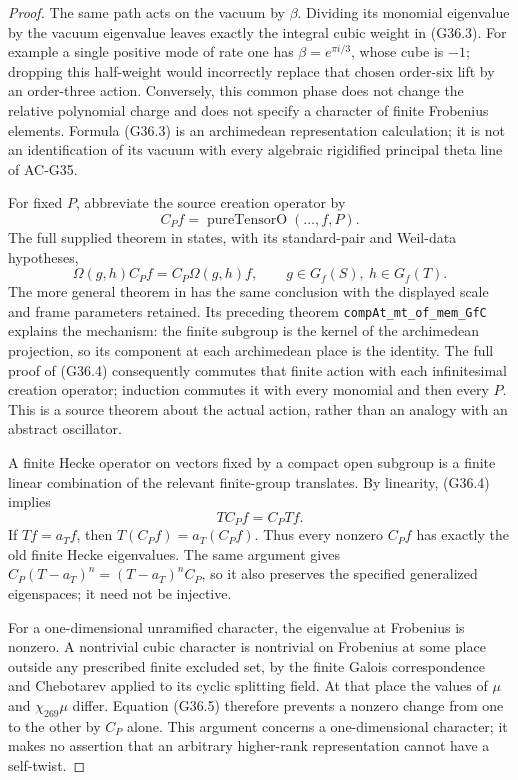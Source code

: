 \begin{proof}
The same path acts on the vacuum by $\beta$.
Dividing its monomial eigenvalue by the vacuum eigenvalue
leaves exactly the integral cubic weight in (G36.3).
For example a single positive mode of rate one has
$\beta=e^{\pi i/3}$, whose cube is $-1$; dropping this
half-weight would incorrectly replace that chosen
order-six lift by an order-three action.
Conversely, this common phase does not change the relative
polynomial charge and does not specify a character of
finite Frobenius elements.
Formula (G36.3) is an archimedean representation calculation;
it is not an identification of its vacuum with every
algebraic rigidified principal theta line of AC-G35.

For fixed $P$, abbreviate the source creation operator by
\[
 C_Pf=\operatorname{pureTensorO}(\ldots,f,P).
\]
The full supplied theorem
in 
states, with its standard-pair and Weil-data hypotheses,
\[
 \Omega(g,h)C_Pf=C_P\Omega(g,h)f,
       \qquad g\in G_f(S),\ h\in G_f(T).              \tag{G36.4}
\]
The more general theorem
in 
has the same conclusion with the displayed scale and frame
parameters retained.
Its preceding theorem \texttt{compAt\_mt\_of\_mem\_GfC}
explains the mechanism: the finite subgroup is the kernel
of the archimedean projection, so its component at each
archimedean place is the identity.
The full proof of (G36.4) consequently commutes that finite
action with each infinitesimal creation operator; induction
commutes it with every monomial and then every $P$.
This is a source theorem about the actual action, rather
than an analogy with an abstract oscillator.

A finite Hecke operator on vectors fixed by a compact open
subgroup is a finite linear combination of the relevant
finite-group translates.  By linearity, (G36.4) implies
\[
                       T C_P f=C_P T f.              \tag{G36.5}
\]
If $Tf=a_Tf$, then $T(C_Pf)=a_T(C_Pf)$.
Thus every nonzero $C_Pf$ has exactly the old finite
Hecke eigenvalues.  The same argument gives
$C_P(T-a_T)^n=(T-a_T)^nC_P$, so it also preserves the
specified generalized eigenspaces; it need not be injective.

For a one-dimensional unramified character, the eigenvalue
at Frobenius is nonzero.  A nontrivial cubic character is
nontrivial on Frobenius at some place outside any prescribed
finite excluded set, by the finite Galois correspondence
and Chebotarev applied to its cyclic splitting field.
At that place the values of $\mu$ and $\chi_{269}\mu$ differ.
Equation (G36.5) therefore prevents a nonzero change from
one to the other by $C_P$ alone.
This argument concerns a one-dimensional character;
it makes no assertion that an arbitrary higher-rank
representation cannot have a self-twist.


\end{proof}
